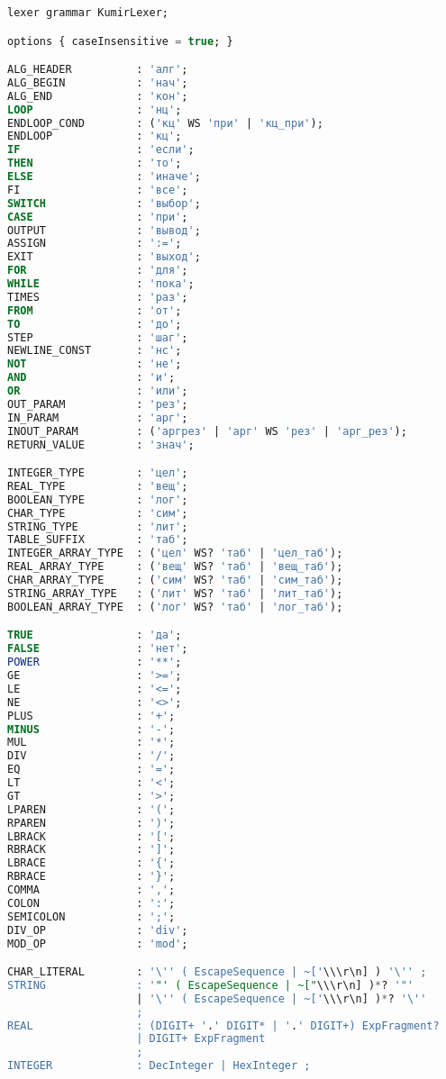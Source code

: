 \begin{lstlisting}[language=sql, caption={Лексер грамматики в формате ANTRL}, label=lst:kafka-click]
lexer grammar KumirLexer;

options { caseInsensitive = true; }

ALG_HEADER          : 'алг';
ALG_BEGIN           : 'нач';
ALG_END             : 'кон';
LOOP                : 'нц';
ENDLOOP_COND        : ('кц' WS 'при' | 'кц_при');
ENDLOOP             : 'кц';
IF                  : 'если';
THEN                : 'то';
ELSE                : 'иначе';
FI                  : 'все';
SWITCH              : 'выбор';
CASE                : 'при';
OUTPUT              : 'вывод';
ASSIGN              : ':=';
EXIT                : 'выход';
FOR                 : 'для';
WHILE               : 'пока';
TIMES               : 'раз';
FROM                : 'от';
TO                  : 'до';
STEP                : 'шаг';
NEWLINE_CONST       : 'нс';
NOT                 : 'не';
AND                 : 'и';
OR                  : 'или';
OUT_PARAM           : 'рез';
IN_PARAM            : 'арг';
INOUT_PARAM         : ('аргрез' | 'арг' WS 'рез' | 'арг_рез');
RETURN_VALUE        : 'знач';

INTEGER_TYPE        : 'цел';
REAL_TYPE           : 'вещ';
BOOLEAN_TYPE        : 'лог';
CHAR_TYPE           : 'сим';
STRING_TYPE         : 'лит';
TABLE_SUFFIX        : 'таб';
INTEGER_ARRAY_TYPE  : ('цел' WS? 'таб' | 'цел_таб');
REAL_ARRAY_TYPE     : ('вещ' WS? 'таб' | 'вещ_таб');
CHAR_ARRAY_TYPE     : ('сим' WS? 'таб' | 'сим_таб');
STRING_ARRAY_TYPE   : ('лит' WS? 'таб' | 'лит_таб');
BOOLEAN_ARRAY_TYPE  : ('лог' WS? 'таб' | 'лог_таб');

TRUE                : 'да';
FALSE               : 'нет';
POWER               : '**';
GE                  : '>=';
LE                  : '<=';
NE                  : '<>';
PLUS                : '+';
MINUS               : '-';
MUL                 : '*';
DIV                 : '/';
EQ                  : '=';
LT                  : '<';
GT                  : '>';
LPAREN              : '(';
RPAREN              : ')';
LBRACK              : '[';
RBRACK              : ']';
LBRACE              : '{';
RBRACE              : '}';
COMMA               : ',';
COLON               : ':';
SEMICOLON           : ';';
DIV_OP              : 'div';
MOD_OP              : 'mod';

CHAR_LITERAL        : '\'' ( EscapeSequence | ~['\\\r\n] ) '\'' ;
STRING              : '"' ( EscapeSequence | ~["\\\r\n] )*? '"'
                    | '\'' ( EscapeSequence | ~['\\\r\n] )*? '\''
                    ;
REAL                : (DIGIT+ '.' DIGIT* | '.' DIGIT+) ExpFragment?
                    | DIGIT+ ExpFragment
                    ;
INTEGER             : DecInteger | HexInteger ;


\end{lstlisting}
